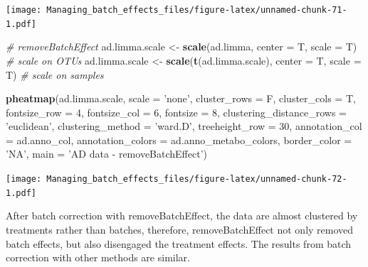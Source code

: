 \documentclass[]{book}
\newenvironment{Shaded}{\begin{snugshade}}{\end{snugshade}}
\newcommand{\KeywordTok}[1]{\textcolor[rgb]{0.13,0.29,0.53}{\textbf{#1}}}
\newcommand{\DataTypeTok}[1]{\textcolor[rgb]{0.13,0.29,0.53}{#1}}
\newcommand{\DecValTok}[1]{\textcolor[rgb]{0.00,0.00,0.81}{#1}}
\newcommand{\StringTok}[1]{\textcolor[rgb]{0.31,0.60,0.02}{#1}}
\newcommand{\CommentTok}[1]{\textcolor[rgb]{0.56,0.35,0.01}{\textit{#1}}}
\newcommand{\NormalTok}[1]{#1}
\begin{document}
\texttt{[image: Managing\_batch\_effects\_files/figure-latex/unnamed-chunk-71-1.pdf]}

\begin{Shaded}
\begin{Highlighting}[]
\CommentTok{# removeBatchEffect}
\NormalTok{ad.limma.scale <-}\StringTok{ }\KeywordTok{scale}\NormalTok{(ad.limma, }\DataTypeTok{center =}\NormalTok{ T, }\DataTypeTok{scale =}\NormalTok{ T) }\CommentTok{# scale on OTUs}
\NormalTok{ad.limma.scale <-}\StringTok{ }\KeywordTok{scale}\NormalTok{(}\KeywordTok{t}\NormalTok{(ad.limma.scale), }\DataTypeTok{center =}\NormalTok{ T, }\DataTypeTok{scale =}\NormalTok{ T) }\CommentTok{# scale on samples}

\KeywordTok{pheatmap}\NormalTok{(ad.limma.scale, }
         \DataTypeTok{scale =} \StringTok{'none'}\NormalTok{, }
         \DataTypeTok{cluster_rows =}\NormalTok{ F, }
         \DataTypeTok{cluster_cols =}\NormalTok{ T, }
         \DataTypeTok{fontsize_row =} \DecValTok{4}\NormalTok{, }\DataTypeTok{fontsize_col =} \DecValTok{6}\NormalTok{,}
         \DataTypeTok{fontsize =} \DecValTok{8}\NormalTok{,}
         \DataTypeTok{clustering_distance_rows =} \StringTok{'euclidean'}\NormalTok{,}
         \DataTypeTok{clustering_method =} \StringTok{'ward.D'}\NormalTok{,}
         \DataTypeTok{treeheight_row =} \DecValTok{30}\NormalTok{,}
         \DataTypeTok{annotation_col =}\NormalTok{ ad.anno_col,}
         \DataTypeTok{annotation_colors =}\NormalTok{ ad.anno_metabo_colors,}
         \DataTypeTok{border_color =} \StringTok{'NA'}\NormalTok{,}
         \DataTypeTok{main =} \StringTok{'AD data - removeBatchEffect'}\NormalTok{)}
\end{Highlighting}
\end{Shaded}

\texttt{[image: Managing\_batch\_effects\_files/figure-latex/unnamed-chunk-72-1.pdf]}

After batch correction with removeBatchEffect, the data are almost
clustered by treatments rather than batches, therefore,
removeBatchEffect not only removed batch effects, but also disengaged
the treatment effects. The results from batch correction with other
methods are similar.
\end{document}
